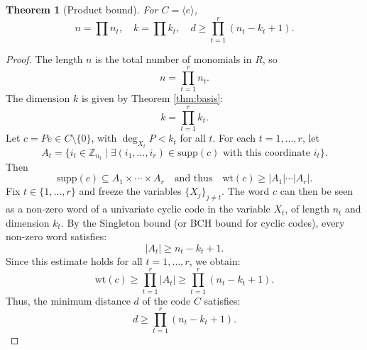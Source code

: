 \documentclass[10pt,a4paper]{amsart}
\newtheorem{thm}{Theorem}
\newcommand{\Zn}[1]{\mathbb{Z}_{#1}}
\newcommand{\supp}{\mathrm{supp}}
\newcommand{\wt}{\mathrm{wt}}
\begin{document}
\begin{thm}[Product bound]\label{thm:bound}
For $C = \langle e \rangle$,
\[
n = \prod n_t, \quad k = \prod k_t, \quad d \ge \prod_{t=1}^r (n_t - k_t + 1).
\]
\end{thm}

\begin{proof}
The length $n$ is the total number of monomials in $R$, so
\[
n = \prod_{t=1}^r n_t.
\]
The dimension $k$ is given by Theorem \ref{thm:basis}:
\[
k = \prod_{t=1}^r k_t.
\]
Let $c = P e \in C \setminus \{0\}$, with $\deg_{X_t} P < k_t$ for all $t$.
For each $t = 1,\dots,r$, let
\[
A_t = \{ i_t \in \Zn{n_t} \mid \exists (i_1,\dots,i_r) \in \supp(c)
\text{ with this coordinate } i_t \}.
\]
Then
\[
\supp(c) \subseteq A_1 \times \cdots \times A_r
\quad\text{and thus}\quad
\wt(c) \ge |A_1|\cdots |A_r|.
\]
Fix $t \in \{1,\dots,r\}$ and freeze the variables $\{X_j\}_{j \neq t}$.
The word $c$ can then be seen as a non-zero word of a univariate cyclic code in the variable $X_t$, of length $n_t$ and dimension $k_t$.
By the Singleton bound (or BCH bound for cyclic codes), every non-zero word satisfies:
\[
|A_t| \ge n_t - k_t + 1.
\]
Since this estimate holds for all $t=1,\dots,r$, we obtain:
\[
\wt(c) \ge \prod_{t=1}^r |A_t|
\ge \prod_{t=1}^r (n_t - k_t + 1).
\]
Thus, the minimum distance $d$ of the code $C$ satisfies:
\[
d \ge \prod_{t=1}^r (n_t - k_t + 1).
\]
\end{proof}
\end{document}
